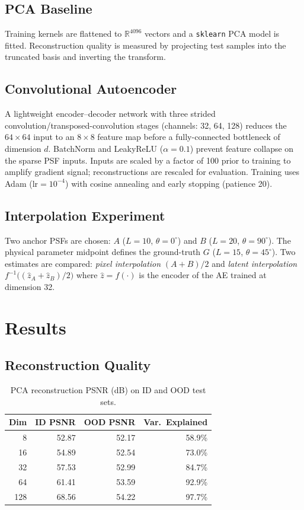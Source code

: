 \documentclass{article}
\begin{document}
\subsection{PCA Baseline}
Training kernels are flattened to $\mathbb{R}^{4096}$ vectors and
a \texttt{sklearn} PCA model is fitted. Reconstruction quality is
measured by projecting test samples into the truncated basis and
inverting the transform.

\subsection{Convolutional Autoencoder}
A lightweight encoder--decoder network with three strided
convolution/transposed-convolution stages (channels: 32, 64, 128)
reduces the $64\times64$ input to an $8\times8$ feature map before a
fully-connected bottleneck of dimension $d$. BatchNorm and
LeakyReLU ($\alpha{=}0.1$) prevent feature collapse on the sparse
PSF inputs. Inputs are scaled by a factor of 100 prior to training
to amplify gradient signal; reconstructions are rescaled for
evaluation. Training uses Adam ($\text{lr}{=}10^{-4}$) with
cosine annealing and early stopping (patience 20).

\subsection{Interpolation Experiment}
Two anchor PSFs are chosen: $A$ ($L{=}10$, $\theta{=}0^{\circ}$) and
$B$ ($L{=}20$, $\theta{=}90^{\circ}$). The physical parameter midpoint
defines the ground-truth $G$ ($L{=}15$, $\theta{=}45^{\circ}$). Two
estimates are compared: \emph{pixel interpolation} $(A+B)/2$ and
\emph{latent interpolation} $f^{-1}\!\bigl((\hat{z}_A +
\hat{z}_B)/2\bigr)$ where $\hat{z} = f(\cdot)$ is the encoder of the
AE trained at dimension 32.

\section{Results}

\subsection{Reconstruction Quality}

\begin{table}[H]
\centering
\caption{PCA reconstruction PSNR (dB) on ID and OOD test sets.}
\begin{tabular}{rrrr}
\toprule
Dim & ID PSNR & OOD PSNR & Var.\ Explained \\
\midrule
        8 & 52.87 & 52.17 & 58.9\% \\
        16 & 54.89 & 52.54 & 73.0\% \\
        32 & 57.53 & 52.99 & 84.7\% \\
        64 & 61.41 & 53.59 & 92.9\% \\
        128 & 68.56 & 54.22 & 97.7\% \\
\bottomrule
\end{tabular}
\end{table}
\end{document}
